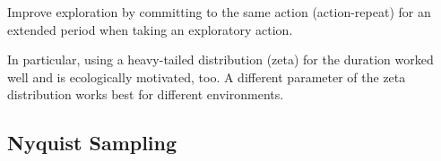 \documentclass[11pt]{article}
\begin{document}
\cite{dabney2020temporally}

Improve exploration by committing to the same action (action-repeat) for an extended period when taking an exploratory action.

In particular, using a heavy-tailed distribution (zeta) for the duration worked well and is ecologically motivated, too. A different parameter of the zeta distribution works best for different environments.

\subsection{Nyquist Sampling}




\end{document}
